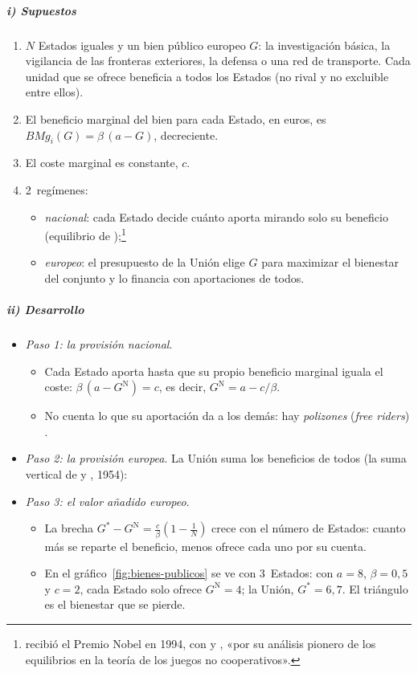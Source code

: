 \documentclass[11pt]{article}
\begin{document}
\subparagraph{i) Supuestos}

\begin{enumerate}
\item $N$ Estados iguales y un bien público europeo $G$: la investigación básica, la vigilancia de las fronteras exteriores, la defensa o una red de transporte. Cada unidad que se ofrece beneficia a todos los Estados (no rival y no excluible entre ellos).
\item El beneficio marginal del bien para cada Estado, en euros, es $\mathit{BMg}_i(G)=\beta\,(a-G)$, decreciente.
\item El coste marginal es constante, $c$.
\item 2~regímenes:
  \begin{itemize}
  \item \emph{nacional}: cada Estado decide cuánto aporta mirando solo su beneficio (equilibrio de );\footnote{ recibió el Premio Nobel en 1994, con  y , «por su análisis pionero de los equilibrios en la teoría de los juegos no cooperativos»\nocite{Nobel1994Nash}.}
  \item \emph{europeo}: el presupuesto de la Unión elige $G$ para maximizar el bienestar del conjunto y lo financia con aportaciones de todos.
  \end{itemize}
\end{enumerate}

\subparagraph{ii) Desarrollo}

\begin{itemize}
\item \emph{Paso 1: la provisión nacional}.
  \begin{itemize}
  \item Cada Estado aporta hasta que su propio beneficio marginal iguala el coste: $\beta\,(a-G^{\mathrm N})=c$, es decir, $G^{\mathrm N}=a-c/\beta$.
  \item No cuenta lo que su aportación da a los demás: hay \emph{polizones} (\emph{free riders}) .
  \end{itemize}
\item \emph{Paso 2: la provisión europea}. La Unión suma los beneficios de todos (la suma vertical de  y , 1954)\nocite{Samuelson1954Pure,Bowen1943Interpretation}:
\item \emph{Paso 3: el valor añadido europeo}.
  \begin{itemize}
  \item La brecha $G^{*}-G^{\mathrm N}=\frac{c}{\beta}\left(1-\frac1N\right)$ crece con el número de Estados: cuanto más se reparte el beneficio, menos ofrece cada uno por su cuenta.
  \item En el gráfico~\ref{fig:bienes-publicos} se ve con 3~Estados: con $a=8$, $\beta=0{,}5$ y $c=2$, cada Estado solo ofrece $G^{\mathrm N}=4$; la Unión, $G^{*}=6{,}7$. El triángulo es el bienestar que se pierde.
  \end{itemize}
\end{itemize}
\end{document}
